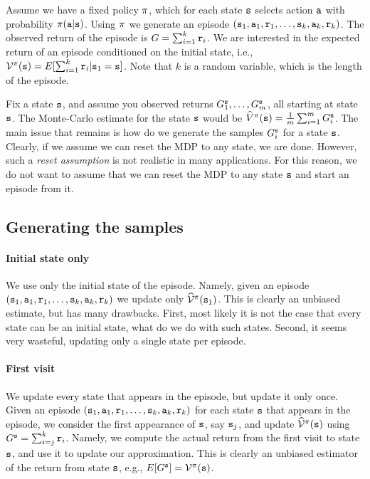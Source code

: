 Assume we have a fixed policy $\pi$, which for each state
${\tt s}$ selects action ${\tt a}$ with probability
$\pi({\tt a}|{\tt s})$. Using $\pi$ we generate an episode
$({\tt s}_1, {\tt a}_1, {\tt r}_1, \ldots ,
{\tt s}_k,{\tt a}_k,{\tt r}_k)$. The observed return of the episode
is $G=\sum_{i=1}^k {\tt r}_i$. We are interested in the expected
return of an episode conditioned on the initial state, i.e.,
$\mathcal{V}^\pi({\tt s})=E[\sum_{i=1}^k {\tt r}_i |{\tt s}_1={\tt s}]$.
Note that $k$ is a random variable, which is the length of the
episode.

Fix a state ${\tt s}$, and assume you observed returns $G^{\tt s}_1,
\ldots , G^{\tt s}_m$, all starting at state ${\tt s}$. The
Monte-Carlo estimate for the state ${\tt s}$ would be
$\widehat{V}^\pi({\tt s})=\frac{1}{m}\sum_{i=1}^m G_i^{\tt s}$. The main
issue that remains is how do we generate the samples $G^{\tt s}_i$
for a state ${\tt s}$. Clearly, if we assume we can reset the MDP to
any state, we are done. However, such a \emph{reset assumption} is
not realistic in many applications. For this reason, we do not want
to assume that we can reset the MDP to any state ${\tt s}$ and start
an episode from it.

\subsection{Generating the samples}

\paragraph{Initial state only}
We use only the initial state of the episode. Namely, given an
episode $({\tt s}_1, {\tt a}_1, {\tt r}_1, \ldots ,
{\tt s}_k,{\tt a}_k,{\tt r}_k)$ we update only
$\widehat{\mathcal{V}}^\pi({\tt s}_1)$. This is clearly an unbiased
estimate, but has many drawbacks. First, most likely it is not the
case that every state can be an initial state, what do we do with
such states. Second, it seems very wasteful, updating only a single
state per episode.

\paragraph{First visit}
We update every state that appears in the episode, but update it
only once. Given an episode $({\tt s}_1, {\tt a}_1, {\tt r}_1, \ldots
, {\tt s}_k,{\tt a}_k,{\tt r}_k)$ for each state ${\tt s}$ that appears
in the episode, we consider the first appearance of ${\tt s}$, say
${\tt s}_j$, and update $\widehat{\mathcal{V}}^\pi({\tt s})$ using
$G^{\tt s}=\sum_{i=j}^k {\tt r}_i$. Namely, we compute the actual
return from the first visit to state ${\tt s}$, and use it to update
our approximation. This is clearly an unbiased estimator of the
return from state ${\tt s}$, e.g.,
$E[G^{\tt s}]=\mathcal{V}^\pi({\tt s})$.

